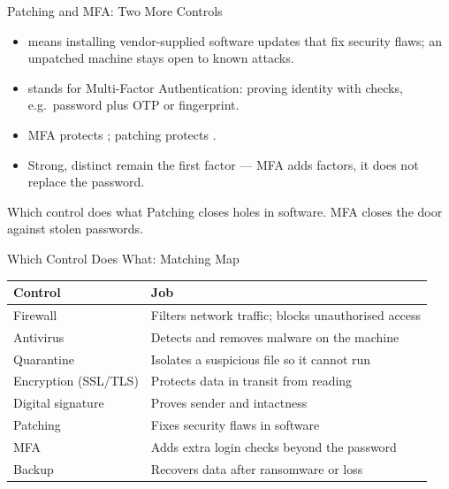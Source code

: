 \documentclass[aspectratio=169]{beamer}
\begin{document}
\begin{frame}{Patching and MFA: Two More Controls}
  \begin{itemize}
    \item {} means installing vendor-supplied software updates
      that fix security flaws; an unpatched machine stays open to known
      attacks.
    \item {} stands for Multi-Factor Authentication: proving identity
      with  checks, e.g.\ password plus OTP or fingerprint.
    \item MFA protects ; patching protects .
    \item Strong, distinct  remain the first factor ---
      MFA adds factors, it does not replace the password.
  \end{itemize}
  \begin{block}{Which control does what}
    Patching closes holes in software. MFA closes the door against stolen
    passwords.
  \end{block}
\end{frame}

\begin{frame}{Which Control Does What: Matching Map}
  \begin{center}
    \begin{tabular}{ll}
      \toprule
      \textbf{Control} & \textbf{Job} \\
      \midrule
      Firewall & Filters network traffic; blocks unauthorised access \\
      Antivirus & Detects and removes malware on the machine \\
      Quarantine & Isolates a suspicious file so it cannot run \\
      Encryption (SSL/TLS) & Protects data in transit from reading \\
      Digital signature & Proves sender and intactness \\
      Patching & Fixes security flaws in software \\
      MFA & Adds extra login checks beyond the password \\
      Backup & Recovers data after ransomware or loss \\
      \bottomrule
    \end{tabular}
  \end{center}
  \vspace{0.25cm}
\end{frame}
\end{document}
